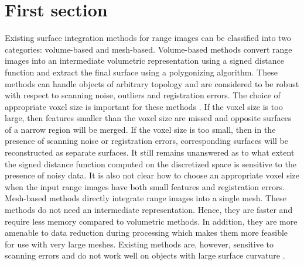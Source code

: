 \section{First section}
Existing surface integration methods for range images can be classified into two categories: volume-based and mesh-based. Volume-based methods \cite{Claes:VolM05,Curless:VolM96,Masuda:VolM02,Hoppe:VolM97,Sato:VolM97,Sun:VolM03} convert range images into an intermediate volumetric representation using a signed distance function and extract the final surface using a polygonizing algorithm. These methods can handle objects of arbitrary topology and are considered to be robust with respect to scanning noise, outliers and registration errors. The choice of appropriate voxel size is important for these methods \cite{Claes:VolM05,Curless:VolM96}. If the voxel size is too large, then features smaller than the voxel size are missed and opposite surfaces of a narrow region will be merged. If the voxel size is too small, then in the presence of scanning noise or registration errors, corresponding surfaces will be reconstructed as separate surfaces. It still remains unanswered as to what extent the signed distance function computed on the discretized space is sensitive to the presence of noisy data. It is also not clear how to choose an appropriate voxel size when the input range images have both small features and registration errors. \\

Mesh-based methods \cite{Pito:MeshM96,Rutishauser:MeshM94,Sappa:MeshM00,Soucy:MeshM92,Soucy:MeshM95,Sun:MeshM00,Turk:MeshM94,Zhou:MeshM06} directly integrate range images into a single mesh. These methods do not need an intermediate representation. Hence, they are faster and require less memory compared to volumetric methods. In addition, they are more amenable to data reduction during processing which makes them more feasible for use with very large meshes. Existing methods are, however, sensitive to scanning errors and do not work well on objects with large surface curvature \cite{Curless:VolM96}.



